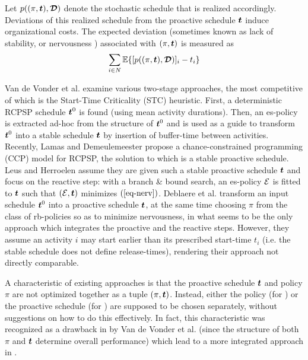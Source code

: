 	Let $p((\pi,\boldsymbol{t}),\boldsymbol{\mathcal{D}})$ denote the stochastic schedule that is realized accordingly.
	Deviations of this realized schedule from the proactive schedule $\boldsymbol{t}$ induce organizational costs.
	The expected deviation (sometimes known as lack of stability, or nervousness \cite{steele1975nervous}) 
	associated with $(\pi,\boldsymbol{t})$ is measured as
   	\begin{align}
  		\sum_{i\in N} \mathbb{E}\{[p((\pi,\boldsymbol{t}),\boldsymbol{\mathcal{D}})]_i - t_i \}	\label{eq-nerv}
  	\end{align}
  	
  	Van de Vonder et al. \cite{van2006trade,van2008,van2007heuristic} 
  	examine various two-stage approaches,
  	the most competitive of which is the Start-Time Criticality (STC) heuristic. 
   	First, a deterministic RCPSP schedule $\boldsymbol{t}^0$ is found (using mean activity durations).
  	Then, an es-policy is extracted ad-hoc from the structure of $\boldsymbol{t}^0$ and is used as a guide to
  	transform $\boldsymbol{t}^0$ into a stable schedule $\boldsymbol{t}$ by insertion of buffer-time between activities.
	Recently, Lamas and Demeulemeester \cite{lamas2014purely} propose a 
	chance-constrained programming (CCP) model for RCPSP, 
	the solution to which is a stable proactive schedule.
	Leus and Herroelen \cite{leus2004stability} assume they are given such
	a stable proactive schedule $\boldsymbol{t}$ and focus on the reactive step:
	with a branch \& bound search, an es-policy $\mathcal{E}$ is fitted to $\boldsymbol{t}$
	 such that $(\mathcal{E},\boldsymbol{t})$ minimizes $(\ref{eq-nerv})$.
	Deblaere et al. \cite{deblaere2011proactive} transform 
	an input schedule $\boldsymbol{t}^0$ into a proactive schedule $\boldsymbol{t}$,
	at the same time choosing $\pi$ from the class of rb-policies so as to minimize nervousness,
	in what seems to be the only approach which integrates the proactive and the reactive steps.
	However, they assume an activity $i$ may start earlier than its prescribed start-time $t_i$
	(i.e. the stable schedule does not define release-times),
	rendering their approach not directly comparable.
	
	A characteristic of existing approaches is that the proactive schedule $\boldsymbol{t}$ and policy $\pi$
	are not optimized together as a tuple $(\pi, \boldsymbol{t})$.
	Instead, either the policy (for \cite{van2008,lamas2014purely}) 
	or the proactive schedule (for \cite{leus2004stability}) are supposed to be chosen separately,
	without suggestions on how to do this effectively.
	In fact, this characteristic was recognized as a drawback in \cite{van2008} by Van de Vonder et al.
	(since the structure of both $\pi$ and $\boldsymbol{t}$ determine overall performance)
	which lead to a more integrated approach in \cite{deblaere2011proactive}.
	

